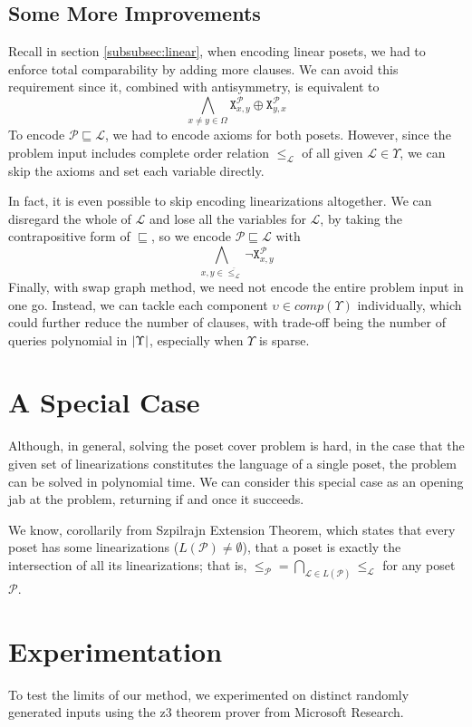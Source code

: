 \documentclass[12pt]{llncs}
\DeclarePairedDelimiter{\abs}{\lvert}{\rvert}
\let\oldleq\leq
\renewcommand{\leq}[1][]{\oldleq_{#1}}
\newcommand{\poset}[1]{\mathcal{#1}}
\newcommand{\uni}[1][]{\Omega_{#1}}
\newcommand{\lang}[1]{L(#1)}
\newcommand{\lext}{\sqsubseteq}
\newcommand{\complmt}[1]{\overline{#1}}
\newcommand{\satvar}[2]{\mathtt{X}_{#1}^{#2}}
\begin{document}
\subsection{Some More Improvements}
Recall in section \ref{subsubsec:linear}, when encoding linear posets, we had to enforce total comparability by adding more clauses. We can avoid this requirement since it, combined with antisymmetry, is equivalent to
\[
\bigwedge_{x \neq y \in \uni} \satvar{x,y}{\poset{P}} \oplus \satvar{y,x}{\poset{P}}
\]
To encode $\poset{P} \lext \poset{L}$, we had to encode axioms for both posets. However, since the problem input includes complete order relation $\leq[\poset{L}]$ of all given $\poset{L} \!\in\! \Upsilon$, we can skip the axioms and set each variable directly.

In fact, it is even possible to skip encoding linearizations altogether. We can disregard the whole of $\poset{L}$ and lose all the variables for $\poset{L}$, by taking the contrapositive form of $\lext$, so we encode $\poset{P} \lext \poset{L}$ with
\[
\bigwedge_{x,y \in \complmt{\leq[\poset{L}]}} \neg \satvar{x,y}{\poset{P}}
\]
Finally, with swap graph method, we need not encode the entire problem input in one go. Instead, we can tackle each component $\upsilon \!\in\! comp(\Upsilon)$ individually, which could further reduce the number of clauses, with trade-off being the number of queries polynomial in $\abs{\Upsilon}$, especially when $\Upsilon$ is sparse.

\section{A Special Case}
Although, in general, solving the poset cover problem is hard, in the case that the given set of linearizations constitutes the language of a single poset, the problem can be solved in polynomial time. We can consider this special case as an opening jab at the problem, returning if and once it succeeds.

We know, corollarily from Szpilrajn Extension Theorem, which states that every poset has some linearizations ($\lang{\poset{P}} \neq \emptyset$), that a poset is exactly the intersection of all its linearizations; that is, $\leq[\poset{P}] = \bigcap_{\poset{L} \in \lang{\poset{P}}} \leq[\poset{L}]$ for any poset $\poset{P}$.

\section{Experimentation}
To test the limits of our method, we experimented on distinct randomly generated inputs using the z3 theorem prover from Microsoft Research.
\end{document}
